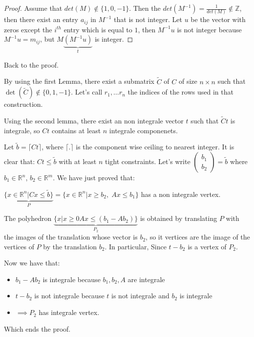 \documentclass[11pt]{article}
\begin{document}
\begin{proof}
Assume that \(det(M) \not \in \{1, 0, -1\}\).
Then the \(det(M^{-1}) = \frac1{ det(M) } \not \in \mathbb{Z}\), then there exist an entry \(a_{ij}\) in \(M^{-1}\) that is not integer.
Let \(u\) be the vector with zeros except  the \(i^{th}\) entry which is equal to \(1\), then \(M^{-1}u\) is not integer because \(M^{-1}u = m_{ij}\), but \(M \underbrace{(M^{-1} u)}_{t}\) is integer.
\end{proof}

Back to the proof.


By using the first Lemma, there exist a submatrix \(\tilde C\) of \(C\) of size \(n \times n\) such that \(\det(\tilde C) \not \in \{0, 1, -1\}\). Let's call \(r_1, \ldots r_n\) the indices of the rows used in that construction.

Using the second lemma, there exist an non integrale vector \(t\) such that \(\tilde C t\) is integrale, so \(Ct\) contains at least \(n\) integrale componenets. 

Let \(\tilde b = \lceil Ct \rceil\), where \(\lceil.\rceil\) is the component wise ceiling to nearest integer.
It is clear that: \(Ct \le \tilde b\) with at least \(n\) tight constraints.
Let's write \(\begin{pmatrix} b_1 \\b_2\end{pmatrix} = \tilde b\) where \(b_1 \in \mathbb R^n\),  \(b_2 \in \mathbb R^m\).
We have just proved that:

\(\underbrace{\{ x \in \mathbb R^{n} |  Cx \le \tilde b\}}_{P} = \{ x \in \mathbb R^{n} | x \ge b_2, \; Ax \le  b_1\}\) has a non integrale vertex.

The polyhedron \(\underbrace{\{ x | x \ge 0 Ax \le (b_1 - Ab_2)\}}_{P_2}\) is obtained by translating \(P\) with the images of the translation whose vector is \(b_2\), so it vertices are the image of the vertices of \(P\) by the translation \(b_2\). In particular, Since \(t - b_2\) is a vertex of \(P_2\).

Now we have that:
\begin{itemize}
\item \(b_1 - Ab_2\) is integrale because \(b_1, b_2, A\) are integrale
\item \(t - b_2\) is not integrale because \(t\) is not integrale and \(b_2\) is integrale
\item \(\implies P_2\) has  integrale vertex.
\end{itemize}

Which ends the proof.
\end{document}
